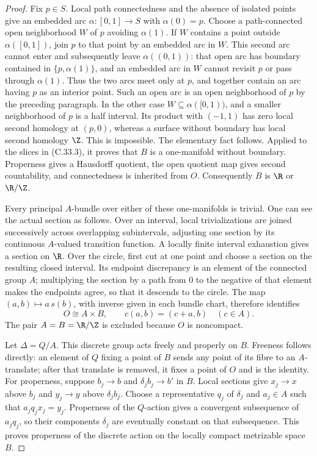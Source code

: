 \begin{proof}
Fix $p\in S$. Local path connectedness and the absence of isolated
points give an embedded arc $\alpha:[0,1]\to S$ with
$\alpha(0)=p$. Choose a path-connected open neighborhood $W$
of $p$ avoiding $\alpha(1)$. If $W$ contains a point outside
$\alpha([0,1])$, join $p$ to that point by an embedded arc in
$W$. This second arc cannot enter and subsequently leave
$\alpha((0,1))$: that open arc has boundary contained in
$\{p,\alpha(1)\}$, and an embedded arc in $W$ cannot revisit
$p$ or pass through $\alpha(1)$. Thus the two arcs meet only
at $p$, and together contain an arc having $p$ as an interior
point. Such an open arc is an open neighborhood of $p$ by the
preceding paragraph.
In the other case $W\subseteq\alpha([0,1))$, and a smaller
neighborhood of $p$ is a half interval. Its product with
$(-1,1)$ has zero local second homology at $(p,0)$,
whereas a surface without boundary has local second homology
$\Z$. This is impossible. The elementary fact follows.
Applied to the slices in (C.33.3), it proves that $B$ is a
one-manifold without boundary. Properness gives a Hausdorff
quotient, the open quotient map gives second countability, and
connectedness is inherited from $O$. Consequently $B$ is
$\R$ or $\R/\Z$.

Every principal $A$-bundle over either of these one-manifolds
is trivial. One can see the actual section as follows.
Over an interval, local trivializations are joined successively
across overlapping subintervals, adjusting one section by its
continuous $A$-valued transition function. A locally finite
interval exhaustion gives a section on $\R$.
Over the circle, first cut at one point and choose a section
on the resulting closed interval. Its endpoint discrepancy is
an element of the connected group $A$; multiplying the section
by a path from $0$ to the negative of that element makes the
endpoints agree, so that it descends to the circle.
The map $(a,b)\mapsto a\,s(b)$, with inverse given in each
bundle chart, therefore identifies
\[
                      O\cong A\times B,\qquad
             c(a,b)=(c+a,b)\quad(c\in A).                \tag{C.33.4}
\]
The pair $A=B=\R/\Z$ is excluded because $O$ is noncompact.

Let $\Delta=Q/A$. This discrete group acts freely and properly
on $B$. Freeness follows directly: an element of $Q$ fixing a
point of $B$ sends any point of its fibre to an $A$-translate;
after that translate is removed, it fixes a point of $O$ and
is the identity.
For properness, suppose $b_j\to b$ and
$\delta_j b_j\to b'$ in $B$. Local sections give $x_j\to x$
above $b_j$ and $y_j\to y$ above $\delta_j b_j$.
Choose a representative $q_j$ of $\delta_j$ and $a_j\in A$
such that $a_jq_jx_j=y_j$. Properness of the $Q$-action gives
a convergent subsequence of $a_jq_j$, so their components
$\delta_j$ are eventually constant on that subsequence.
This proves properness of the discrete action on the locally
compact metrizable space $B$.


\end{proof}
